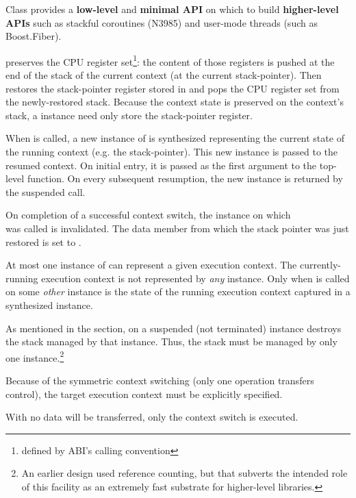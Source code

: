 Class \ectx provides a {\bfseries low-level} and {\bfseries minimal API} on
which to build {\bfseries higher-level APIs} such as stackful coroutines
(N3985\cite{N3985}) and user-mode threads (such as Boost.Fiber\cite{bfiber}).


\ectxop preserves the CPU register set\footnote{defined by ABI's calling
convention}: the content of those registers is pushed at the end of the stack
of the current context (at the current stack-pointer). Then \op restores the
stack-pointer register stored in  and pops the CPU register set
from the newly-restored stack.
Because the context state is preserved on the context's stack, a \ectx
instance need only store the stack-pointer register.


When \ectxop is called, a new instance of \ectx is synthesized representing
the current state of the running context (e.g. the stack-pointer). This new
instance is passed to the resumed context. On initial entry, it is passed as
the first argument to the top-level function. On every subsequent resumption,
the new \ectx instance is returned by the suspended \op call.

On completion of a successful context switch, the \ectx instance on which\\
\op was called is invalidated. The data member from which the stack pointer was
just restored is set to .

At most one instance of \ectx can represent a given execution context. The
currently-running execution context is not represented by \emph{any} \ectx
instance. Only when \op is called on some \emph{other} \ectx instance is the
state of the running execution context captured in a synthesized \ectx
instance.

As mentioned in the 
section,  on a suspended (not terminated)
instance destroys the stack managed by that instance. Thus, the stack must be
managed by only one \ectx instance.\footnote{An earlier design used reference
counting, but that subverts the intended role of this facility as an extremely
fast substrate for higher-level libraries.}

Because of the symmetric context switching (only one operation transfers
control), the target execution context must be explicitly specified.


\uabschnitt{\ectxvoid}
\label{subsec:ectxvoid}
With \ectxvoid no data will be transferred, only the context switch is
executed.

